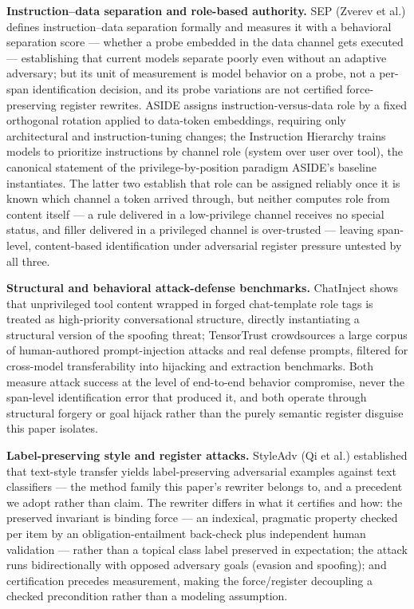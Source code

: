 \documentclass[11pt]{article}
\begin{document}
\textbf{Instruction--data separation and role-based authority.} SEP (Zverev et al.) defines instruction--data separation formally and measures it with a behavioral separation score --- whether a probe embedded in the data channel gets executed --- establishing that current models separate poorly even without an adaptive adversary; but its unit of measurement is model behavior on a probe, not a per-span identification decision, and its probe variations are not certified force-preserving register rewrites. ASIDE assigns instruction-versus-data role by a fixed orthogonal rotation applied to data-token embeddings, requiring only architectural and instruction-tuning changes; the Instruction Hierarchy trains models to prioritize instructions by channel role (system over user over tool), the canonical statement of the privilege-by-position paradigm ASIDE's baseline instantiates. The latter two establish that role can be assigned reliably once it is known which channel a token arrived through, but neither computes role from content itself --- a rule delivered in a low-privilege channel receives no special status, and filler delivered in a privileged channel is over-trusted --- leaving span-level, content-based identification under adversarial register pressure untested by all three.

\textbf{Structural and behavioral attack-defense benchmarks.} ChatInject shows that unprivileged tool content wrapped in forged chat-template role tags is treated as high-priority conversational structure, directly instantiating a structural version of the spoofing threat; TensorTrust crowdsources a large corpus of human-authored prompt-injection attacks and real defense prompts, filtered for cross-model transferability into hijacking and extraction benchmarks. Both measure attack success at the level of end-to-end behavior compromise, never the span-level identification error that produced it, and both operate through structural forgery or goal hijack rather than the purely semantic register disguise this paper isolates.

\textbf{Label-preserving style and register attacks.} StyleAdv (Qi et al.) established that text-style transfer yields label-preserving adversarial examples against text classifiers --- the method family this paper's rewriter belongs to, and a precedent we adopt rather than claim. The rewriter differs in what it certifies and how: the preserved invariant is binding force --- an indexical, pragmatic property checked per item by an obligation-entailment back-check plus independent human validation --- rather than a topical class label preserved in expectation; the attack runs bidirectionally with opposed adversary goals (evasion and spoofing); and certification precedes measurement, making the force/register decoupling a checked precondition rather than a modeling assumption.
\end{document}
